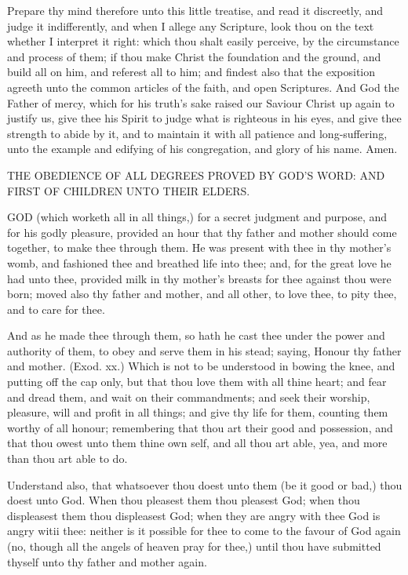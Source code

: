 Prepare thy mind therefore unto this little treatise, and 
read it discreetly, and judge it indifferently, and when I
allege any Scripture, look thou on the text whether I interpret
it right: which thou shalt easily perceive, by the circumstance
and process of them; if thou make Christ the 
foundation and the ground, and build all on him, and referest
all to him; and findest also that the exposition 
agreeth unto the common articles of the faith, and open 
Scriptures. And God the Father of mercy, which for his 
truth's sake raised our Saviour Christ up again to justify 
us, give thee his Spirit to judge what is righteous in his 
eyes, and give thee strength to abide by it, and to maintain
it with all patience and long-suffering, unto the 
example and edifying of his congregation, and glory of his 
name. Amen. 


THE 
OBEDIENCE OF ALL DEGREES 
PROVED BY GOD'S WORD: AND FIRST OF CHILDREN 
UNTO THEIR ELDERS.

GOD (which worketh all in all things,) for a secret 
judgment and purpose, and for his godly pleasure, 
provided an hour that thy father and mother should come 
together, to make thee through them. He was present 
with thee in thy mother's womb, and fashioned thee 
and breathed life into thee; and, for the great love he had 
unto thee, provided milk in thy mother's breasts for thee 
against thou were born; moved also thy father and 
mother, and all other, to love thee, to pity thee, and to 
care for thee. 

And as he made thee through them, so hath he cast thee 
under the power and authority of them, to obey and serve 
them in his stead; saying, Honour thy father and mother. 
(Exod. xx.) Which is not to be understood in bowing 
the knee, and putting off the cap only, but that thou love 
them with all thine heart; and fear and dread them, and 
wait on their commandments; and seek their worship,
pleasure, will and profit in all things; and give thy life for 
them, counting them worthy of all honour; remembering 
that thou art their good and possession, and that thou 
owest unto them thine own self, and all thou art able, yea, 
and more than thou art able to do.

Understand also, that whatsoever thou doest unto them 
(be it good or bad,) thou doest unto God. When thou 
pleasest them thou pleasest God; when thou displeasest 
them thou displeasest God; when they are angry with 
thee God is angry witii thee: neither is it possible for 
thee to come to the favour of God again (no, though 
all the angels of heaven pray for thee,) until thou have 
submitted thyself unto thy father and mother again. 

